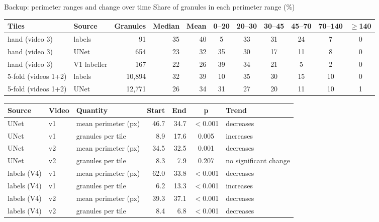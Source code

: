 \begin{frame}{Backup: perimeter ranges and change over time}
  \centering\scriptsize
  \renewcommand{\arraystretch}{1.05}\setlength{\tabcolsep}{3.5pt}
  Share of granules in each perimeter range (\%)\\[1mm]
\begin{tabular}{@{}llrrrcccccc@{}}
\toprule
\textbf{Tiles} & \textbf{Source} & \textbf{Granules} & \textbf{Median} & \textbf{Mean} & \textbf{0--20} & \textbf{20--30} & \textbf{30--45} & \textbf{45--70} & \textbf{70--140} & \textbf{$\geq$140} \\
\midrule
hand (video 3) & labels & 91 & 35 & 40 & 5 & 33 & 31 & 24 & 7 & 0 \\
hand (video 3) & UNet & 654 & 23 & 32 & 35 & 30 & 17 & 11 & 8 & 0 \\
hand (video 3) & V1 labeller & 167 & 22 & 26 & 39 & 34 & 21 & 5 & 2 & 0 \\
5-fold (videos 1+2) & labels & 10,894 & 32 & 39 & 10 & 35 & 30 & 15 & 10 & 0 \\
5-fold (videos 1+2) & UNet & 12,771 & 26 & 34 & 31 & 27 & 20 & 11 & 10 & 1 \\
\bottomrule
\end{tabular}

  \vspace{2mm}
\begin{tabular}{@{}lllrrcl@{}}
\toprule
\textbf{Source} & \textbf{Video} & \textbf{Quantity} & \textbf{Start} & \textbf{End} & \textbf{p} & \textbf{Trend} \\
\midrule
UNet & v1 & mean perimeter (px) & 46.7 & 34.7 & $<$0.001 & decreases \\
UNet & v1 & granules per tile & 8.9 & 17.6 & 0.005 & increases \\
UNet & v2 & mean perimeter (px) & 34.5 & 32.5 & 0.001 & decreases \\
UNet & v2 & granules per tile & 8.3 & 7.9 & 0.207 & no significant change \\
labels (V4) & v1 & mean perimeter (px) & 62.0 & 33.8 & $<$0.001 & decreases \\
labels (V4) & v1 & granules per tile & 6.2 & 13.3 & $<$0.001 & increases \\
labels (V4) & v2 & mean perimeter (px) & 39.3 & 37.1 & $<$0.001 & decreases \\
labels (V4) & v2 & granules per tile & 8.4 & 6.8 & $<$0.001 & decreases \\
\bottomrule
\end{tabular}
  \vfill
\end{frame}

